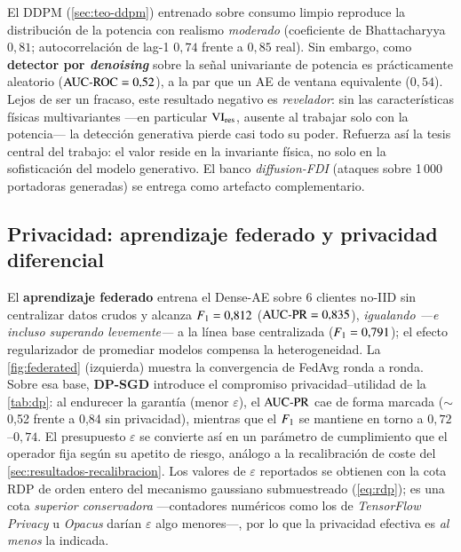 El DDPM (\cref{sec:teo-ddpm}) entrenado sobre consumo limpio reproduce la distribución de la potencia con realismo \emph{moderado} (coeficiente de Bhattacharyya $0{,}81$; autocorrelación de lag-1 $0{,}74$ frente a $0{,}85$ real). Sin embargo, como \textbf{detector por \textit{denoising}} sobre la señal univariante de potencia es prácticamente aleatorio ($\text{AUC-ROC}=0{,}52$), a la par que un AE de ventana equivalente ($0{,}54$). Lejos de ser un fracaso, este resultado negativo es \emph{revelador}: sin las características físicas multivariantes ---en particular $\mathrm{VI}_{\text{res}}$, ausente al trabajar solo con la potencia--- la detección generativa pierde casi todo su poder. Refuerza así la tesis central del trabajo: el valor reside en la invariante física, no solo en la sofisticación del modelo generativo. El banco \emph{diffusion-FDI} (ataques sobre 1\,000 portadoras generadas) se entrega como artefacto complementario.

\subsection{Privacidad: aprendizaje federado y privacidad diferencial}
\label{sec:res-federated}

El \textbf{aprendizaje federado} entrena el Dense-AE sobre 6 clientes no-IID sin centralizar datos crudos y alcanza $F_{1}=0{,}812$ ($\text{AUC-PR}=0{,}835$), \emph{igualando ---e incluso superando levemente---} a la línea base centralizada ($F_{1}=0{,}791$); el efecto regularizador de promediar modelos compensa la heterogeneidad. La \cref{fig:federated} (izquierda) muestra la convergencia de FedAvg ronda a ronda. Sobre esa base, \textbf{DP-SGD} introduce el compromiso privacidad--utilidad de la \cref{tab:dp}: al endurecer la garantía (menor $\varepsilon$), el $\text{AUC-PR}$ cae de forma marcada ($\sim$0,52 frente a 0,84 sin privacidad), mientras que el $F_{1}$ se mantiene en torno a $0{,}72$--$0{,}74$. El presupuesto $\varepsilon$ se convierte así en un parámetro de cumplimiento que el operador fija según su apetito de riesgo, análogo a la recalibración de coste del \cref{sec:resultados-recalibracion}. Los valores de $\varepsilon$ reportados se obtienen con la cota RDP de orden entero del mecanismo gaussiano submuestreado (\cref{eq:rdp}); es una cota \emph{superior conservadora} ---contadores numéricos como los de \textit{TensorFlow Privacy} u \textit{Opacus} darían $\varepsilon$ algo menores---, por lo que la privacidad efectiva es \emph{al menos} la indicada.


